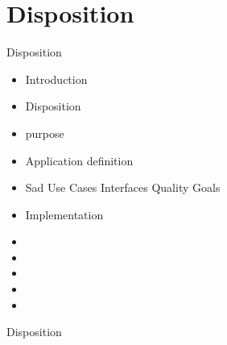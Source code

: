 \section*{Disposition}
\begin{frame}{Disposition}
\begin{itemize}
	\item Introduction
	\item Disposition
	\item purpose
	\item Application definition
	\item Sad
	\subitem Use Cases
	\subitem Interfaces
	\subitem Quality Goals
	\subitem 
	\item Implementation
	\subitem
	\subitem
	\item
	\item
	\item
	\item
	\item
\end{itemize}

Disposition


\end{frame}